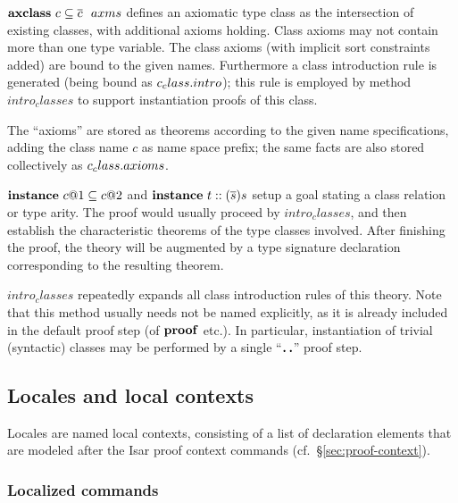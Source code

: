 \begin{descr}
  
\item [${\mathord{\mathbf{axclass}}}~c \subseteq \overline{c}~~axms$] defines an axiomatic type class as
  the intersection of existing classes, with additional axioms holding.  Class
  axioms may not contain more than one type variable.  The class axioms (with
  implicit sort constraints added) are bound to the given names.  Furthermore
  a class introduction rule is generated (being bound as
  $c_class{\mathord.}intro$); this rule is employed by method $intro_classes$ to
  support instantiation proofs of this class.
  
  The ``axioms'' are stored as theorems according to the given name
  specifications, adding the class name $c$ as name space prefix; the same
  facts are also stored collectively as $c_class{\mathord.}axioms$.
  
\item [${\mathord{\mathbf{instance}}}~c@1 \subseteq c@2$ and ${\mathord{\mathbf{instance}}}~t :: (\overline{s})s$] setup a
  goal stating a class relation or type arity.  The proof would usually
  proceed by $intro_classes$, and then establish the characteristic theorems
  of the type classes involved.  After finishing the proof, the theory will be
  augmented by a type signature declaration corresponding to the resulting
  theorem.

\item [$intro_classes$] repeatedly expands all class introduction rules of
  this theory.  Note that this method usually needs not be named explicitly,
  as it is already included in the default proof step (of ${\mathord{\mathbf{proof}}}$ etc.).
  In particular, instantiation of trivial (syntactic) classes may be performed
  by a single ``$\textbf{.\,.}$'' proof step.

\end{descr}


\subsection{Locales and local contexts}\label{sec:locale}

Locales are named local contexts, consisting of a list of declaration elements
that are modeled after the Isar proof context commands (cf.\
\S\ref{sec:proof-context}).


\subsubsection{Localized commands}

